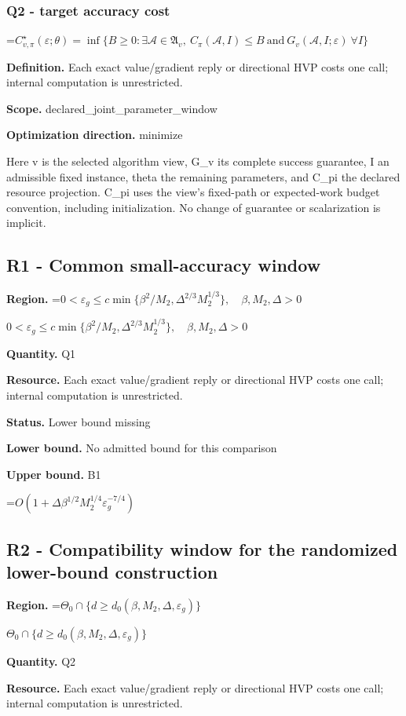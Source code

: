 \documentclass[10pt,a4paper]{article}
\newcommand{\AtlasMath}[1]{\par\begingroup\centering\setbox0=\hbox{$\displaystyle #1$}\ifdim\wd0>1.4\linewidth\typeout{ATLAS WIDE FORMULA: \the\wd0}\fi\ifdim\wd0>\linewidth\resizebox{\linewidth}{!}{\box0}\else\box0\fi\par\endgroup}
\newcommand{\AtlasInlineMath}[1]{\begingroup\setbox0=\hbox{$#1$}\ifdim\wd0>.4\linewidth\endgroup\AtlasMath{#1}\else\endgroup$#1$\fi}
\begin{document}
\subsubsection{Q2 - target accuracy cost}
\AtlasMath{C^\star_{v,\pi}(\varepsilon;\theta)=\inf\{B\ge0:\exists\mathcal A\in\mathfrak A_v,\ C_\pi(\mathcal A,I)\le B\ \text{and}\ G_v(\mathcal A,I;\varepsilon)\ \forall I\}}
\textbf{Definition.} Each exact value/gradient reply or directional HVP costs one call; internal computation is unrestricted.

\textbf{Scope.} declared\_joint\_parameter\_window

\textbf{Optimization direction.} minimize

Here v is the selected algorithm view, G\_v its complete success guarantee, I an admissible fixed instance, theta the remaining parameters, and C\_pi the declared resource projection. C\_pi uses the view's fixed-path or expected-work budget convention, including initialization. No change of guarantee or scalarization is implicit.

\subsection{R1 - Common small-accuracy window}
\textbf{Region.} \AtlasInlineMath{0<\varepsilon_g\le c\min\{\beta^2/M_2,\Delta^{2/3}M_2^{1/3}\},\quad\beta,M_2,\Delta>0}

\textbf{Quantity.} Q1

\textbf{Resource.} Each exact value/gradient reply or directional HVP costs one call; internal computation is unrestricted.

\textbf{Status.} Lower bound missing

\textbf{Lower bound.} No admitted bound for this comparison

\textbf{Upper bound.} B1

\AtlasMath{O(1+\Delta\beta^{1/2}M_2^{1/4}\varepsilon_g^{-7/4})}
\subsection{R2 - Compatibility window for the randomized lower-bound construction}
\textbf{Region.} \AtlasInlineMath{\Theta_0\cap\{d\ge d_0(\beta,M_2,\Delta,\varepsilon_g)\}}

\textbf{Quantity.} Q2

\textbf{Resource.} Each exact value/gradient reply or directional HVP costs one call; internal computation is unrestricted.
\end{document}
